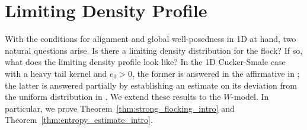 \documentclass[11pt,letterpaper]{amsart}
\theoremstyle{plain}
\theoremstyle{definition}
\theoremstyle{remark}
\newcommand{\thm}[1]{Theorem~\ref{#1}}
\begin{document}
\section{Limiting Density Profile}
\label{sec:limiting_density_profile}
With the conditions for alignment and global well-posedness in 1D at hand, two natural questions arise.
Is there a limiting density distribution for the flock?  If so, what does the limiting density profile look like?  
In the 1D Cucker-Smale case with a heavy tail kernel and $e_0 > 0$, 
the former is answered in the affirmative in \cite{Sbook}; 
the latter is answered partially by establishing an estimate on its 
deviation from the uniform distribution in \cite{LS-entropy}.  We extend these results to the $W$-model. 
In particular, we prove \thm{thm:strong_flocking_intro} and \thm{thm:entropy_estimate_intro}.
\end{document}
